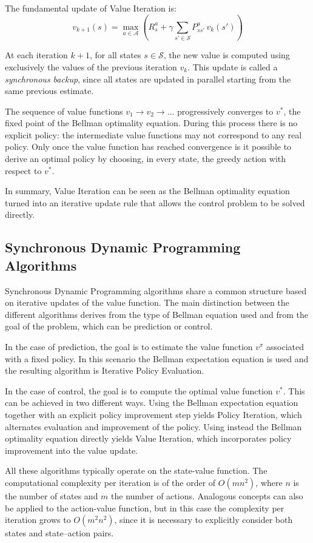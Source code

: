 The fundamental update of Value Iteration is:
\[
v_{k+1}(s) = \max_{a \in \mathcal{A}} \left( R_s^a + \gamma \sum_{s' \in \mathcal{S}} P_{ss'}^a \, v_k(s') \right)
\]

At each iteration $k+1$, for all states $s \in \mathcal{S}$, the new value is computed using exclusively the values of the previous iteration $v_k$. This update is called a \emph{synchronous backup}, since all states are updated in parallel starting from the same previous estimate.

The sequence of value functions $v_1 \rightarrow v_2 \rightarrow \dots$ progressively converges to $v^*$, the fixed point of the Bellman optimality equation. During this process there is no explicit policy: the intermediate value functions may not correspond to any real policy. Only once the value function has reached convergence is it possible to derive an optimal policy by choosing, in every state, the greedy action with respect to $v^*$.

In summary, Value Iteration can be seen as the Bellman optimality equation turned into an iterative update rule that allows the control problem to be solved directly.


\subsection{Synchronous Dynamic Programming Algorithms}

Synchronous Dynamic Programming algorithms share a common structure based on iterative updates of the value function. The main distinction between the different algorithms derives from the type of Bellman equation used and from the goal of the problem, which can be prediction or control.

In the case of prediction, the goal is to estimate the value function $v^\pi$ associated with a fixed policy. In this scenario the Bellman expectation equation is used and the resulting algorithm is Iterative Policy Evaluation.

In the case of control, the goal is to compute the optimal value function $v^*$. This can be achieved in two different ways. Using the Bellman expectation equation together with an explicit policy improvement step yields Policy Iteration, which alternates evaluation and improvement of the policy. Using instead the Bellman optimality equation directly yields Value Iteration, which incorporates policy improvement into the value update.

All these algorithms typically operate on the state-value function. The computational complexity per iteration is of the order of $O(mn^2)$, where $n$ is the number of states and $m$ the number of actions. Analogous concepts can also be applied to the action-value function, but in this case the complexity per iteration grows to $O(m^2 n^2)$, since it is necessary to explicitly consider both states and state–action pairs.

